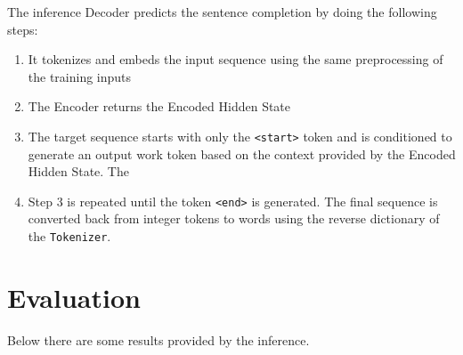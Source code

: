 \documentclass{article}
\begin{document}
The inference Decoder predicts the sentence completion by doing the following steps:

\begin{enumerate}
\item
  It tokenizes and embeds the input sequence using the same preprocessing of the training inputs
\item
  The Encoder returns the Encoded Hidden State
\item
  The target sequence starts with only the \texttt{\textless{}start\textgreater{}} token and is conditioned to generate an output work token based on the context provided by the Encoded Hidden State. The
\item
  Step 3 is repeated until the token \texttt{\textless{}end\textgreater{}} is generated. The final sequence is converted back from integer tokens to words using the reverse dictionary of the \texttt{Tokenizer}.
\end{enumerate}

\section{Evaluation}\label{evaluation}

Below there are some results provided by the inference.
\end{document}
